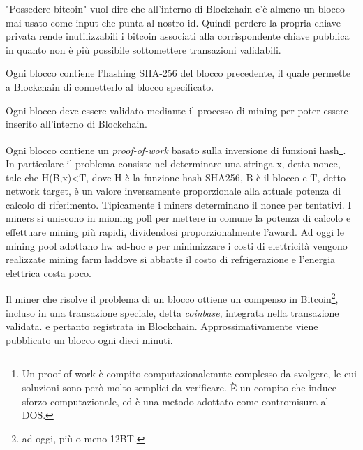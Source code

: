 "Possedere bitcoin" vuol dire che all'interno di Blockchain c'è almeno un blocco mai usato come input che punta al nostro id. Quindi perdere la propria chiave privata rende inutilizzabili i bitcoin associati alla corrispondente chiave pubblica in quanto non è più possibile sottomettere transazioni validabili.

Ogni blocco contiene l'hashing SHA-256 del blocco precedente, il quale permette a Blockchain di connetterlo al blocco specificato.

Ogni blocco deve essere validato mediante il processo di mining per poter essere inserito all'interno di Blockchain.

Ogni blocco contiene un \textit{proof-of-work} basato sulla inversione di funzioni hash\footnote{Un proof-of-work è compito computazionalemnte complesso da svolgere, le cui soluzioni sono però molto semplici da verificare. È un compito che induce sforzo computazionale, ed è una metodo adottato come contromisura al DOS.}.
In particolare il problema consiste nel determinare una stringa x, detta nonce, tale che H(B,x)<T, dove H è la funzione hash SHA256, B è il blocco e T, detto network target, è un valore inversamente proporzionale alla attuale potenza di calcolo di riferimento. Tipicamente i miners determinano il nonce per tentativi.
I miners si uniscono in mioning poll per mettere in comune la potenza di calcolo e effettuare mining più rapidi, dividendosi proporzionalmente l'award.
Ad oggi le mining pool adottano hw ad-hoc e per minimizzare i costi di elettricità vengono realizzate mining farm laddove si abbatte il costo di refrigerazione e l'energia elettrica costa poco.

Il miner che risolve il problema di un blocco ottiene un compenso in Bitcoin\footnote{ad oggi, più o meno 12BT.}, incluso in una transazione speciale, detta \textit{coinbase}, integrata nella transazione validata. e pertanto registrata in Blockchain. Approssimativamente viene pubblicato un blocco ogni dieci minuti.
